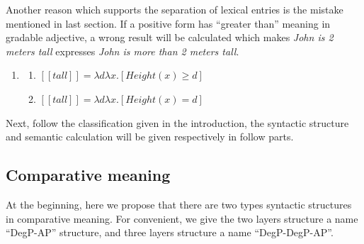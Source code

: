 \documentclass{ctexart}
\begin{document}
Another reason which supports the separation of lexical entries is the mistake mentioned in last section. If a positive form has ``greater than'' meaning in gradable adjective, a wrong result will be calculated which makes \textit{John is 2 meters tall} expresses \textit{John is more than 2 meters tall}.

\begin{enumerate}
    \item \label{tallLE_re}
    
    \begin{enumerate}
        \item \label{tallLE_re_a} 
        $[\![tall]\!]=\lambda d \lambda x.[Height(x) \geq d]$
    
        \item \label{tallLE_re_b} 
        $[\![tall]\!]=\lambda d \lambda x.[Height(x) = d]$
    
    \end{enumerate}
\end{enumerate}

Next, follow the classification given in the introduction, the syntactic structure and semantic calculation will be given respectively in follow parts.

\subsection{Comparative meaning}

\noindent
At the beginning, here we propose that there are two types syntactic structures in comparative meaning. For convenient, we give the two layers structure a name ``DegP-AP'' structure, and three layers structure a name ``DegP-DegP-AP''. 
\end{document}
